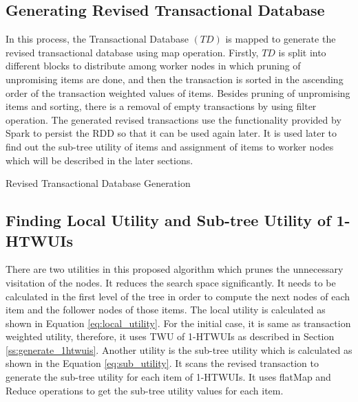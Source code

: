 \documentclass[11pt,openright]{report}
\begin{document}
\subsection{Generating Revised Transactional Database} \label{ss:generate-revised-transactions}
In this process, the Transactional Database $(TD)$ is mapped to generate the revised transactional database using map operation. Firstly, $TD$ is split into different blocks to distribute among worker nodes in which pruning of unpromising items are done, and then the transaction is sorted in the ascending order of the transaction weighted values of items. Besides pruning of unpromising items and sorting, there is a removal of empty transactions by using filter operation. The generated revised transactions use the functionality provided by Spark to persist the RDD so that it can be used again later. It is used later to find out the sub-tree utility of items and assignment of items to worker nodes which will be described in the later sections.

{\SetAlgoNoLine
	\begin{algorithm}
		
		
		\caption{Revised Transactional Database Generation}           
		\label{alg:revised_transaction_generation}
	\end{algorithm}
}

\subsection{Finding Local Utility and Sub-tree Utility of 1-HTWUIs}
There are two utilities in this proposed algorithm which prunes the unnecessary visitation of the nodes. It reduces the search space significantly. It needs to be calculated in the first level of the tree in order to compute the next nodes of each item and the follower nodes of those items. The local utility is calculated as shown in Equation \ref{eq:local_utility}. For the initial case, it is same as transaction weighted utility, therefore, it uses TWU of 1-HTWUIs as described in Section \ref{ss:generate_1htwuis}. Another utility is the sub-tree utility which is calculated as shown in the Equation \ref{eq:sub_utility}. It scans the revised transaction to generate the sub-tree utility for each item of 1-HTWUIs. It uses flatMap and Reduce operations to get the sub-tree utility values for each item.
\end{document}
